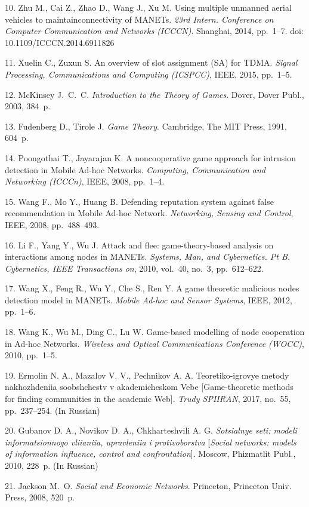{10. Zhu M., Cai Z., Zhao D., Wang J., Xu M. Using multiple
unmanned aerial vehicles to maintain\linebreak connectivity of
MANETs. {\em 23rd Intern. Conference on Computer Communication and
Networks (ICCCN)}. Shanghai, 2014, pp.~1--7. doi:
10.1109/ICCCN.2014.6911826

11. Xuelin C., Zuxun S. An overview of slot assignment (SA) for
TDMA. {\em Signal Processing, Communications and Computing
(ICSPCC)}, IEEE, 2015, pp.~1--5.

12. McKinsey J.~C.~C. \textit{Introduction to the Theory of
Games}. Dover, Dover Publ., 2003, 384~p.\newpage

13. Fudenberg D., Tirole J. \textit{Game Theory}. Cambridge, The
MIT Press, 1991, 604~p.

14. Poongothai T.,  Jayarajan K. A noncooperative game approach
for intrusion detection in Mobile Ad-hoc Networks. {\em Computing,
Communication and Networking (ICCCn)}, IEEE, 2008, pp.~1--4.

15. Wang F., Mo Y., Huang B. Defending reputation system against
false recommendation in Mobile Ad-hoc Network.  {\em Networking,
Sensing and Control}, IEEE, 2008, pp.~488--493.

16. Li F., Yang Y., Wu J. Attack and flee: game-theory-based
analysis on interactions among nodes in MANETs.  {\em Systems,
Man, and Cybernetics. Pt B. Cybernetics, IEEE Transactions on},
2010, vol.~40, no.~3, pp.~612--622.

17. Wang X., Feng R., Wu Y., Che S., Ren Y. A game theoretic
malicious nodes detection model in MANETs.  {\em Mobile Ad-hoc and
Sensor Systems}, IEEE, 2012, pp.~1--6.

18. Wang K., Wu M., Ding C., Lu W. Game-based modelling of node
cooperation in Ad-hoc Networks. {\em Wireless and Optical
Communications Conference (WOCC)}, 2010, pp.~1--5.

19. Ermolin N. A., Mazalov V. V., Pechnikov A. A.
Teoretiko-igrovye metody nakhozhdeniia soobshchestv v
akademicheskom Vebe [Game-theoretic methods for finding
communities in the academic Web]. {\em Trudy SPIIRAN}, 2017,
no.~55, pp.~237--254. (In Russian)

20. Gubanov D. A., Novikov D. A., Chkharteshvili A. G. {\it
Sotsialnye seti: modeli informatsionnogo vliianiia, upravleniia i
protivoborstva} [{\em Social networks: models of information
influence, control and confrontation}]. Moscow, Phizmatlit Publ.,
2010, 228~p. (In Russian)

21. Jackson M.~O. {\em Social and Economic Networks}. Princeton,
Princeton Univ. Press, 2008, 520~p.

}
